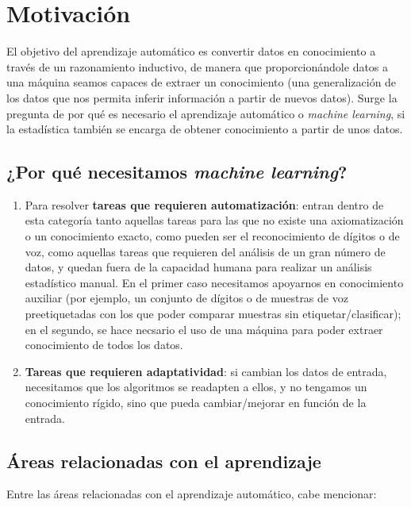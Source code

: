 \section{Motivación}

El objetivo del aprendizaje automático es convertir datos en conocimiento a través de un razonamiento inductivo, de manera que
proporcionándole datos a una máquina seamos capaces de extraer un conocimiento (una generalización de los datos que nos permita
inferir información a partir de nuevos datos). Surge la pregunta de por qué es necesario el aprendizaje automático o 
\textit{machine learning}, si la estadística también se encarga de obtener conocimiento a partir de unos datos.

\subsection{¿Por qué necesitamos \textit{machine learning}?}
\begin{enumerate}[i]
 \item Para resolver \textbf{tareas que requieren automatización}: entran dentro de esta categoría tanto aquellas tareas para
 las que no existe una axiomatización o un conocimiento exacto, como pueden ser el reconocimiento de dígitos o de voz, como 
 aquellas tareas que requieren del análisis de un gran número de datos, y quedan fuera de la capacidad humana para realizar
 un análisis estadístico manual. En el primer caso necesitamos apoyarnos en conocimiento auxiliar (por ejemplo, 
 un conjunto de dígitos o de muestras de voz preetiquetadas con los que poder comparar muestras sin etiquetar/clasificar); 
 en el segundo, se hace necsario el uso de una máquina para poder extraer conocimiento de todos los datos.
 
 \item \textbf{Tareas que requieren adaptatividad}: si cambian los datos de entrada, necesitamos que los algoritmos se readapten
 a ellos, y no tengamos un conocimiento rígido, sino que pueda cambiar/mejorar en función de la entrada.
\end{enumerate}

\subsection{Áreas relacionadas con el aprendizaje}
Entre las áreas relacionadas con el aprendizaje automático, cabe mencionar:

